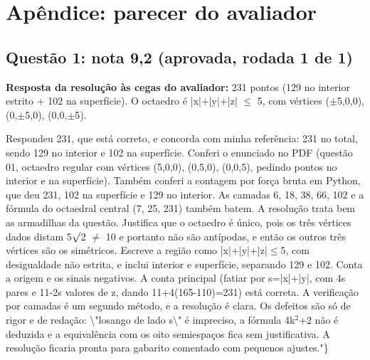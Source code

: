 \documentclass{article}%
\begin{document}
\section*{Apêndice: parecer do avaliador}%
\subsection*{Questão 1: nota 9,2 (aprovada, rodada 1 de 1)}%
\textbf{Resposta da resolução às cegas do avaliador:} 231 pontos (129 no interior estrito + 102 na superfície). O octaedro é |x|+|y|+|z| $\leq$ 5, com vértices ($\pm$5,0,0), (0,$\pm$5,0), (0,0,$\pm$5).\par %
Respondeu 231, que está correto, e concorda com minha referência: 231 no total, sendo 129 no interior e 102 na superfície. Conferi o enunciado no PDF (questão 01, octaedro regular com vértices (5,0,0), (0,5,0), (0,0,5), pedindo pontos no interior e na superfície). Também conferi a contagem por força bruta em Python, que deu 231, 102 na superfície e 129 no interior. As camadas 6, 18, 38, 66, 102 e a fórmula do octaedral central (7, 25, 231) também batem. A resolução trata bem as armadilhas da questão. Justifica que o octaedro é único, pois os três vértices dados distam 5$\surd$2 $\neq$ 10 e portanto não são antípodas, e então os outros três vértices são os simétricos. Escreve a região como |x|+|y|+|z|$\leq$5, com desigualdade não estrita, e inclui interior e superfície, separando 129 e 102. Conta a origem e os sinais negativos. A conta principal (fatiar por s=|x|+|y|, com 4s pares e 11-2s valores de z, dando 11+4(165-110)=231) está correta. A verificação por camadas é um segundo método, e a resolução é clara. Os defeitos são só de rigor e de redação: \textbackslash{}"losango de lado s\textbackslash{}" é impreciso, a fórmula 4k$^2$+2 não é deduzida e a equivalência com os oito semiespaços fica sem justificativa. A resolução ficaria pronta para gabarito comentado com pequenos ajustes."\}%
\end{document}
